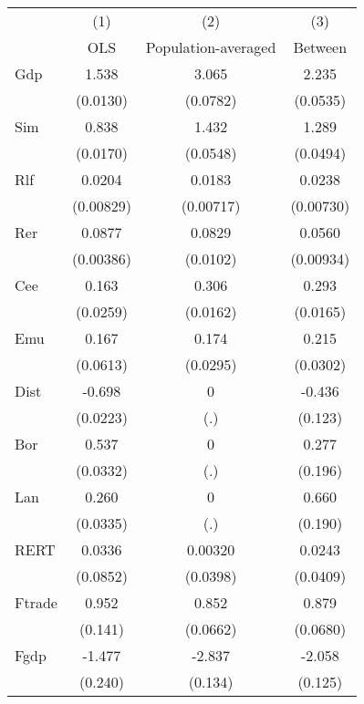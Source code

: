 \begin{tabular}{l*{3}{c}}
\hline\hline
            &\multicolumn{1}{c}{(1)}&\multicolumn{1}{c}{(2)}&\multicolumn{1}{c}{(3)}\\
            &\multicolumn{1}{c}{OLS}&\multicolumn{1}{c}{Population-averaged}&\multicolumn{1}{c}{Between}\\
\hline
Gdp         &       1.538&       3.065&       2.235\\
            &    (0.0130)&    (0.0782)&    (0.0535)\\
[1em]
Sim         &       0.838&       1.432&       1.289\\
            &    (0.0170)&    (0.0548)&    (0.0494)\\
[1em]
Rlf         &      0.0204&      0.0183&      0.0238\\
            &   (0.00829)&   (0.00717)&   (0.00730)\\
[1em]
Rer         &      0.0877&      0.0829&      0.0560\\
            &   (0.00386)&    (0.0102)&   (0.00934)\\
[1em]
Cee         &       0.163&       0.306&       0.293\\
            &    (0.0259)&    (0.0162)&    (0.0165)\\
[1em]
Emu         &       0.167&       0.174&       0.215\\
            &    (0.0613)&    (0.0295)&    (0.0302)\\
[1em]
Dist        &      -0.698&           0&      -0.436\\
            &    (0.0223)&         (.)&     (0.123)\\
[1em]
Bor         &       0.537&           0&       0.277\\
            &    (0.0332)&         (.)&     (0.196)\\
[1em]
Lan         &       0.260&           0&       0.660\\
            &    (0.0335)&         (.)&     (0.190)\\
[1em]
RERT        &      0.0336&     0.00320&      0.0243\\
            &    (0.0852)&    (0.0398)&    (0.0409)\\
[1em]
Ftrade      &       0.952&       0.852&       0.879\\
            &     (0.141)&    (0.0662)&    (0.0680)\\
[1em]
Fgdp        &      -1.477&      -2.837&      -2.058\\
            &     (0.240)&     (0.134)&     (0.125)\\

\end{tabular}
